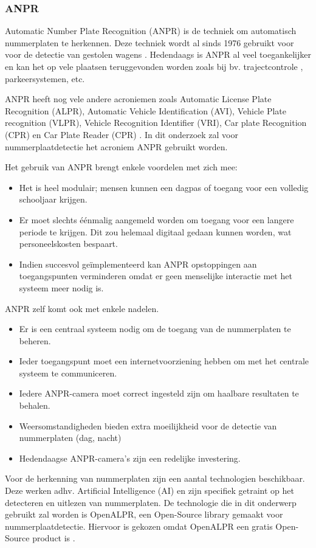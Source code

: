 \subsubsection{ANPR}
Automatic Number Plate Recognition (ANPR) is de techniek om automatisch nummerplaten te herkennen. Deze techniek wordt al sinds 1976 gebruikt voor voor de detectie van gestolen wagens \autocite{uk2011anpr}. Hedendaags is ANPR al veel toegankelijker en kan het op vele plaatsen teruggevonden worden zoals bij bv. trajectcontrole \autocite{de2014snelheidscamera}, parkeersystemen, etc.
\par
ANPR heeft nog vele andere acroniemen zoals Automatic License Plate Recognition (ALPR), Automatic Vehicle Identification (AVI), Vehicle Plate recognition (VLPR), Vehicle Recognition Identifier (VRI), Car plate Recognition (CPR) en Car Plate Reader (CPR) \autocite{axis2019license}. In dit onderzoek zal voor nummerplaatdetectie het acroniem ANPR gebruikt worden.
\par
Het gebruik van ANPR brengt enkele voordelen met zich mee:
\begin{itemize}
	\item Het is heel modulair; mensen kunnen een dagpas of toegang voor een volledig schooljaar krijgen.
	\item Er moet slechts éénmalig aangemeld worden om toegang voor een langere periode te krijgen. Dit zou helemaal digitaal gedaan kunnen worden, wat personeelskosten bespaart.
	\item Indien succesvol geïmplementeerd kan ANPR opstoppingen aan toegangspunten verminderen omdat er geen menselijke interactie met het systeem meer nodig is.
\end{itemize}
\par
ANPR zelf komt ook met enkele nadelen.
\begin{itemize}
	\item Er is een centraal systeem nodig om de toegang van de nummerplaten te beheren.
	\item Ieder toegangspunt moet een internetvoorziening hebben om met het centrale systeem te communiceren.
	\item Iedere ANPR-camera moet correct ingesteld zijn om haalbare resultaten te behalen.
	\item Weersomstandigheden bieden extra moeilijkheid voor de detectie van nummerplaten (dag, nacht)
	\item Hedendaagse ANPR-camera's zijn een redelijke investering.
\end{itemize}
\par
Voor de herkenning van nummerplaten zijn een aantal technologien beschikbaar. Deze werken adhv. Artificial Intelligence (AI) en zijn specifiek getraint op het detecteren en uitlezen van nummerplaten.
De technologie die in dit onderwerp gebruikt zal worden is OpenALPR, een Open-Source library gemaakt voor nummerplaatdetectie. Hiervoor is gekozen omdat OpenALPR een gratis Open-Source product is \autocite{openalprgithub}.


